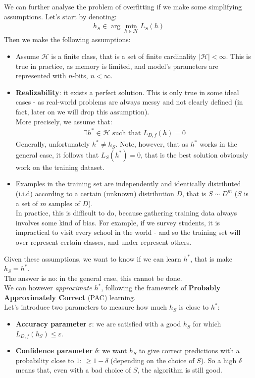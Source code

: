 \documentclass[../template.tex]{subfiles}
\begin{document}
We can further analyse the problem of overfitting if we make some simplifying assumptions. Let's start by denoting:
\begin{align*}
    h_S \in \arg \underset{h\in \mathcal{H}}{\min} L_S(h)
\end{align*}
Then we make the following assumptions:
\begin{itemize}
    \item Assume $\mathcal{H}$ is a finite class, that is a set of finite cardinality $|\mathcal{H}| < \infty$. This is true in practice, as memory is limited, and model's parameters are represented with $n$-bits, $n < \infty$.
    \item \textbf{Realizability}: it exists a perfect solution. This is only true in some ideal cases - as real-world problems are always messy and not clearly defined (in fact, later on we will drop this assumption).\\
    More precisely, we assume that:
    \begin{align*}
        \exists h^* \in \mathcal{H} \text{ such that } L_{D,f}(h) = 0
    \end{align*} 
    Generally, unfortunately $h^* \neq h_S$. Note, however, that as $h^*$ works in the general case, it follows that $L_S(h^*)=0$, that is the best solution obviously work on the training dataset.  
    \item Examples in the training set are independently and identically distributed (i.i.d) according to a certain (unknown) distribution $D$, that is $S \sim D^m$ ($S$ is a set of $m$ samples of $D$).\\
    In practice, this is difficult to do, because gathering training data always involves some kind of bias. For example, if we survey students, it is impractical to visit every school in the world - and so the training set will over-represent certain classes, and under-represent others.  
\end{itemize}
Given these assumptions, we want to know if we can learn $h^*$, that is make $h_S = h^*$.\\
The answer is no: in the general case, this cannot be done.\\
We can however \textit{approximate} $h^*$, following the framework of \textbf{Probably Approximately Correct} (PAC) learning.\\
Let's introduce two parameters to measure how much $h_S$ is close to $h^*$: 
\begin{itemize}
    \item \textbf{Accuracy parameter} $\varepsilon$: we are satisfied with a good $h_S$ for which ${L_{D,f}(h_S) \leq \varepsilon}$.
    \item \textbf{Confidence parameter} $\delta$: we want $h_S$ to give correct predictions with a probability close to $1$: $\geq 1-\delta$ (depending on the choice of $S$). So a high $\delta$ means that, even with a bad choice of $S$, the algorithm is still good.     
\end{itemize}
\end{document}
